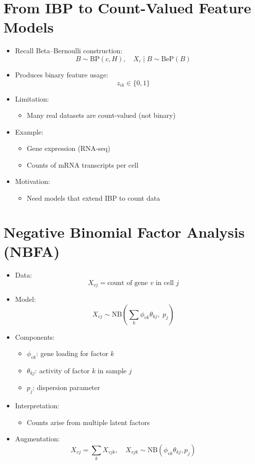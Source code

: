 \documentclass[12pt,oneside]{book}
\numberwithin{equation}{section}
\theoremstyle{definition}
\theoremstyle{plain}
\theoremstyle{remark}
\begin{document}
\section{From IBP to Count-Valued Feature Models}

\begin{itemize}
\item Recall Beta--Bernoulli construction:
\[
B \sim \text{BP}(c, H), \quad X_i \mid B \sim \text{BeP}(B)
\]

\item Produces binary feature usage:
\[
z_{ik} \in \{0,1\}
\]

\item Limitation:
\begin{itemize}
\item Many real datasets are count-valued (not binary)
\end{itemize}

\item Example:
\begin{itemize}
\item Gene expression (RNA-seq)
\item Counts of mRNA transcripts per cell
\end{itemize}

\item Motivation:
\begin{itemize}
\item Need models that extend IBP to count data
\end{itemize}
\end{itemize}

\section{Negative Binomial Factor Analysis (NBFA)}

\begin{itemize}
\item Data:
\[
X_{vj} = \text{count of gene } v \text{ in cell } j
\]

\item Model:
\[
X_{vj} \sim \text{NB}\left( \sum_k \phi_{vk} \theta_{kj}, \; p_j \right)
\]

\item Components:
\begin{itemize}
\item $\phi_{vk}$: gene loading for factor $k$
\item $\theta_{kj}$: activity of factor $k$ in sample $j$
\item $p_j$: dispersion parameter
\end{itemize}

\item Interpretation:
\begin{itemize}
\item Counts arise from multiple latent factors
\end{itemize}

\item Augmentation:
\[
X_{vj} = \sum_k X_{vjk}, \quad X_{vjk} \sim \text{NB}(\phi_{vk}\theta_{kj}, p_j)
\]
\end{itemize}
\end{document}

